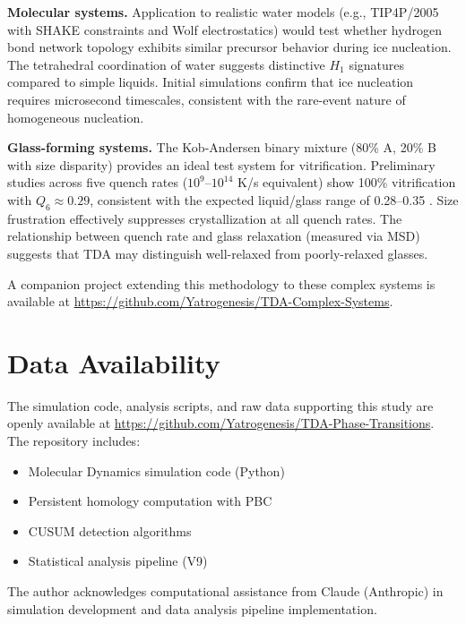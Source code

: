 \documentclass[twocolumn,showpacs,preprintnumbers,amsmath,amssymb,prb,floatfix]{revtex4-2}
\begin{document}
\textbf{Molecular systems.} Application to realistic water models (e.g., TIP4P/2005 with SHAKE constraints and Wolf electrostatics) would test whether hydrogen bond network topology exhibits similar precursor behavior during ice nucleation. The tetrahedral coordination of water suggests distinctive $H_1$ signatures compared to simple liquids. Initial simulations confirm that ice nucleation requires microsecond timescales, consistent with the rare-event nature of homogeneous nucleation.

\textbf{Glass-forming systems.} The Kob-Andersen binary mixture (80\% A, 20\% B with size disparity) provides an ideal test system for vitrification. Preliminary studies across five quench rates ($10^9$--$10^{14}$ K/s equivalent) show 100\% vitrification with $Q_6 \approx 0.29$, consistent with the expected liquid/glass range of 0.28--0.35 \cite{steinhardt1983}. Size frustration effectively suppresses crystallization at all quench rates. The relationship between quench rate and glass relaxation (measured via MSD) suggests that TDA may distinguish well-relaxed from poorly-relaxed glasses.

A companion project extending this methodology to these complex systems is available at \url{https://github.com/Yatrogenesis/TDA-Complex-Systems}.

\section*{Data Availability}

The simulation code, analysis scripts, and raw data supporting this study are openly available at \url{https://github.com/Yatrogenesis/TDA-Phase-Transitions}. The repository includes:
\begin{itemize}
    \item Molecular Dynamics simulation code (Python)
    \item Persistent homology computation with PBC
    \item CUSUM detection algorithms
    \item Statistical analysis pipeline (V9)
\end{itemize}

\bigskip

\begin{acknowledgments}
The author acknowledges computational assistance from Claude (Anthropic) in simulation development and data analysis pipeline implementation.
\end{acknowledgments}
\end{document}
